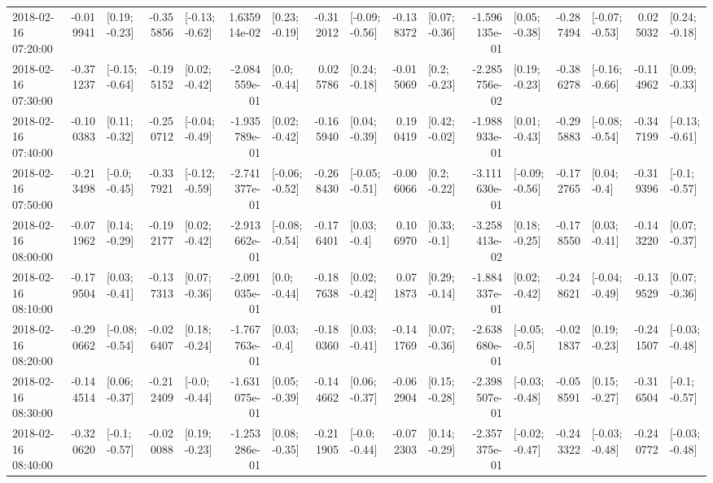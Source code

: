 \begin{tabular}{lrlrlrlrlrlrlrlrl}
2018-02-16 07:20:00 & -0.019941 &   [0.19; -0.23] & -0.355856 &  [-0.13; -0.62] &  1.635914e-02 &   [0.23; -0.19] & -0.312012 &  [-0.09; -0.56] & -0.138372 &   [0.07; -0.36] & -1.596135e-01 &   [0.05; -0.38] & -0.287494 &  [-0.07; -0.53] &  0.025032 &   [0.24; -0.18] \\
2018-02-16 07:30:00 & -0.371237 &  [-0.15; -0.64] & -0.195152 &   [0.02; -0.42] & -2.084559e-01 &    [0.0; -0.44] &  0.025786 &   [0.24; -0.18] & -0.015069 &    [0.2; -0.23] & -2.285756e-02 &   [0.19; -0.23] & -0.386278 &  [-0.16; -0.66] & -0.114962 &   [0.09; -0.33] \\
2018-02-16 07:40:00 & -0.100383 &   [0.11; -0.32] & -0.250712 &  [-0.04; -0.49] & -1.935789e-01 &   [0.02; -0.42] & -0.165940 &   [0.04; -0.39] &  0.190419 &   [0.42; -0.02] & -1.988933e-01 &   [0.01; -0.43] & -0.295883 &  [-0.08; -0.54] & -0.347199 &  [-0.13; -0.61] \\
2018-02-16 07:50:00 & -0.213498 &   [-0.0; -0.45] & -0.337921 &  [-0.12; -0.59] & -2.741377e-01 &  [-0.06; -0.52] & -0.268430 &  [-0.05; -0.51] & -0.006066 &    [0.2; -0.22] & -3.111630e-01 &  [-0.09; -0.56] & -0.172765 &    [0.04; -0.4] & -0.319396 &   [-0.1; -0.57] \\
2018-02-16 08:00:00 & -0.071962 &   [0.14; -0.29] & -0.192177 &   [0.02; -0.42] & -2.913662e-01 &  [-0.08; -0.54] & -0.176401 &    [0.03; -0.4] &  0.106970 &    [0.33; -0.1] & -3.258413e-02 &   [0.18; -0.25] & -0.178550 &   [0.03; -0.41] & -0.143220 &   [0.07; -0.37] \\
2018-02-16 08:10:00 & -0.179504 &   [0.03; -0.41] & -0.137313 &   [0.07; -0.36] & -2.091035e-01 &    [0.0; -0.44] & -0.187638 &   [0.02; -0.42] &  0.071873 &   [0.29; -0.14] & -1.884337e-01 &   [0.02; -0.42] & -0.248621 &  [-0.04; -0.49] & -0.139529 &   [0.07; -0.36] \\
2018-02-16 08:20:00 & -0.290662 &  [-0.08; -0.54] & -0.026407 &   [0.18; -0.24] & -1.767763e-01 &    [0.03; -0.4] & -0.180360 &   [0.03; -0.41] & -0.141769 &   [0.07; -0.36] & -2.638680e-01 &   [-0.05; -0.5] & -0.021837 &   [0.19; -0.23] & -0.241507 &  [-0.03; -0.48] \\
2018-02-16 08:30:00 & -0.144514 &   [0.06; -0.37] & -0.212409 &   [-0.0; -0.44] & -1.631075e-01 &   [0.05; -0.39] & -0.144662 &   [0.06; -0.37] & -0.062904 &   [0.15; -0.28] & -2.398507e-01 &  [-0.03; -0.48] & -0.058591 &   [0.15; -0.27] & -0.316504 &   [-0.1; -0.57] \\
2018-02-16 08:40:00 & -0.320620 &   [-0.1; -0.57] & -0.020088 &   [0.19; -0.23] & -1.253286e-01 &   [0.08; -0.35] & -0.211905 &   [-0.0; -0.44] & -0.072303 &   [0.14; -0.29] & -2.357375e-01 &  [-0.02; -0.47] & -0.243322 &  [-0.03; -0.48] & -0.240772 &  [-0.03; -0.48] \\

\end{tabular}

